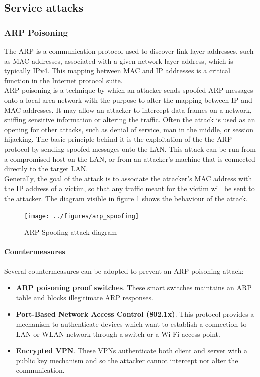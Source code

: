 \documentclass[final]{article}
\begin{document}
\subsection{Service attacks}
\subsubsection{ARP Poisoning}
The \ac{ARP} is a communication protocol used to discover link layer addresses,
such as MAC addresses, associated with a given network layer address, which is typically IPv4.
This mapping between MAC and IP addresses is a critical function in the Internet protocol suite. \\
\ac{ARP} poisoning is a technique by which an attacker sends spoofed \ac{ARP} messages
onto a local area network with the purpose to alter the mapping between IP and MAC addresses.
It may allow an attacker to intercept data frames on a network, sniffing sensitive information or altering the traffic.
Often the attack is used as an opening for other attacks,
such as denial of service, man in the middle, or session hijacking.
The basic principle behind it is the exploitation of the the
\ac{ARP} protocol by sending spoofed messages onto the LAN.
This attack can be run from a compromised host on the LAN,
or from an attacker's machine that is connected directly to the target LAN.\\
Generally, the goal of the attack is to associate the attacker's MAC address
with the IP address of a victim, so that any traffic meant for the victim
will be sent to the attacker.
The diagram visible in figure \ref{arp_spoofing} shows the behaviour of the attack.
\begin{figure}
  \center
  \texttt{[image: ../figures/arp\_spoofing]}
  \caption{ARP Spoofing attack diagram}
  \label{arp_spoofing}
\end{figure}

\paragraph{Countermeasures}
Several countermeasures can be adopted to prevent an \ac{ARP} poisoning attack:
\begin{itemize}
  \item \textbf{\ac{ARP} poisoning proof switches}. These smart switches maintains an \ac{ARP} table and blocks illegitimate ARP responses.
  \item \textbf{Port-Based Network Access Control (802.1x)}. This protocol provides a mechanism to authenticate devices which want to establish a connection to LAN or WLAN network through a switch or a Wi-Fi access point.
  \item \textbf{Encrypted VPN}. These VPNs authenticate both client and server with a public key mechanism and so the attacker cannot intercept nor alter the communication.
\end{itemize}
\end{document}
